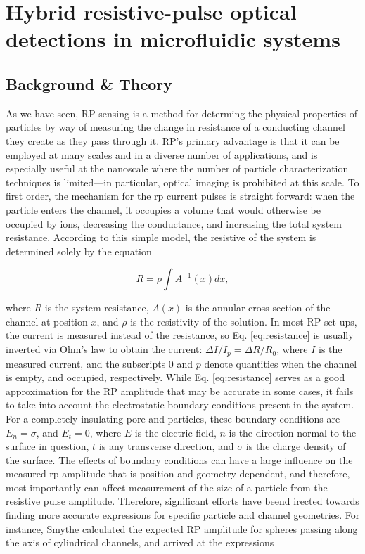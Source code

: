 \graphicspath{{../images/ch6/}}	%


\chapter{Hybrid resistive-pulse optical detections in microfluidic systems}
\label{chap:rpim}

	

	\section{Background \& Theory}
		
		As we have seen, RP sensing is a method for determing the physical properties of particles by way of measuring the change in resistance of a conducting channel they create as they pass through it. RP's primary advantage is that it can be employed at many scales and in a diverse number of applications, and is especially useful at the nanoscale where the number of particle characterization techniques is limited---in particular, optical imaging is prohibited at this scale. To first order, the mechanism for the rp current pulses is straight forward: when the particle enters the channel, it occupies a volume that would otherwise be occupied by ions, decreasing the conductance, and increasing the total system resistance. According to this simple model, the resistive of the system is determined solely by the equation
		
		\begin{equation}\label{eq:resistance}
			R=\rho\int A^{-1}\left(x\right) dx,
		\end{equation}
		
		where $R$ is the system resistance, $A\left(x\right)$ is the annular cross-section of the channel at position $x$, and $\rho$ is the resistivity of the solution. In most RP set ups, the current is measured instead of the resistance, so Eq. \ref{eq:resistance} is usually inverted via Ohm's law to obtain the current: $\Delta I/I_{p}=\Delta R/R_{0}$, where $I$ is the measured current, and the subscripts $0$ and $p$ denote quantities when the channel is empty, and occupied, respectively. While Eq. \ref{eq:resistance} serves as a good approximation for the RP amplitude that may be accurate in some cases, it fails to take into account the electrostatic boundary conditions present in the system. For a completely insulating pore and particles, these boundary conditions are $E_{n}=\sigma$, and $E_{t}=0$, where $E$ is the electric field, $n$ is the direction normal to the surface in question, $t$ is any transverse direction, and $\sigma$ is the charge density of the surface. The effects of boundary conditions can have a large influence on the measured rp amplitude that is position and geometry dependent, and therefore, most importantly can affect measurement of the size of a particle from the resistive pulse amplitude. Therefore, significant efforts have beend irected towards finding more accurate expressions for specific particle and channel geometries. For instance, Smythe calculated the expected RP amplitude for spheres passing along the axis of cylindrical channels, and arrived at the expressions
		
